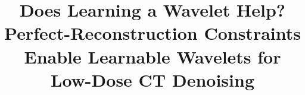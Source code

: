 \documentclass[conference]{IEEEtran}
\begin{document}
\title{Does Learning a Wavelet Help?\\ Perfect-Reconstruction Constraints Enable
Learnable Wavelets for Low-Dose CT Denoising}

\author{
}

\maketitle
\end{document}
